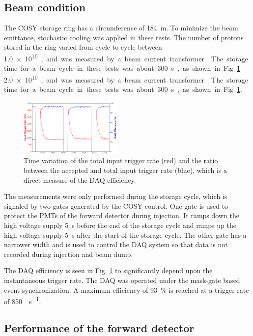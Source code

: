 \documentclass[number,5p]{elsarticle}
\begin{document}
\subsection{Beam condition}
\label{sec:beam}
The COSY storage ring has a circumference of \SI{184}{\meter}.
To minimize the beam emittance, stochastic cooling \cite{cooling} was applied in
these tests.
The number of protons stored in the ring varied from cycle to cycle between
\SIrange{1.0e10}{2.0e10}, and was measured by a beam current transformer \cite{bct}.
The storage time for a beam cycle in these tests was about \SI{300}{\second}, as shown in Fig. \ref{fig:beam}.
\begin{figure}[h]
  \centering
  \includegraphics[width=0.45\textwidth]{./daq_efficiency.png}
  \caption{Time variation of the total input trigger rate (red) and the ratio between the accepted and total input trigger rate (blue), which is a direct measure of the DAQ efficiency.}
  \label{fig:beam}
\end{figure}

The measurements were only performed during the storage cycle, which is signaled by two
gates generated by the COSY control.
One gate is used to protect the PMTs of the forward detector during injection.
It ramps down the high voltage supply \SI{5}{\second} before the end of the
storage cycle and ramps up the high voltage supply \SI{5}{\second} after the start of the storage cycle.
The other gate has a narrower width and is used to control the DAQ system so
that data is not recorded during injection and beam dump.

The DAQ efficiency is seen in Fig. \ref{fig:beam} to significantly depend upon the
instantaneous trigger rate.
The DAQ was operated under the mask-gate based event synchronization.
A maximum efficiency of \SI{93}{\percent} is reached at a trigger rate of \SI{850}{\event\per\second}.

\subsection{Performance of the forward detector}
\label{sec:fwd_performance}
\end{document}
